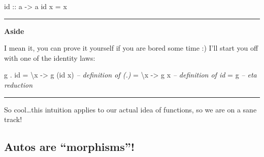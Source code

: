 \documentclass[]{article}
\newenvironment{Shaded}{}{}
\newcommand{\DecValTok}[1]{\textcolor[rgb]{0.25,0.63,0.44}{{#1}}}
\newcommand{\CommentTok}[1]{\textcolor[rgb]{0.38,0.63,0.69}{\textit{{#1}}}}
\newcommand{\OtherTok}[1]{\textcolor[rgb]{0.00,0.44,0.13}{{#1}}}
\newcommand{\FunctionTok}[1]{\textcolor[rgb]{0.02,0.16,0.49}{{#1}}}
\newcommand{\NormalTok}[1]{{#1}}
\begin{document}
\begin{Shaded}
\begin{Highlighting}[]
\NormalTok{id}\OtherTok{ ::} \NormalTok{a }\OtherTok{->} \NormalTok{a}
\NormalTok{id x }\FunctionTok{=} \NormalTok{x}
\end{Highlighting}
\end{Shaded}

\begin{Shaded}
\end{Shaded}

\begin{center}\rule{0.5\linewidth}{\linethickness}\end{center}

\textbf{Aside}

I mean it, you can prove it yourself if you are bored some time :) I'll start
you off with one of the identity laws:

\begin{Shaded}
\begin{Highlighting}[]
\NormalTok{g }\FunctionTok{.} \NormalTok{id }\FunctionTok{=} \NormalTok{\textbackslash{}x }\OtherTok{->} \NormalTok{g (id x)     }\CommentTok{-- definition of (.)}
       \FunctionTok{=} \NormalTok{\textbackslash{}x }\OtherTok{->} \NormalTok{g x          }\CommentTok{-- definition of id}
       \FunctionTok{=} \NormalTok{g                  }\CommentTok{-- eta reduction}
\end{Highlighting}
\end{Shaded}

\begin{center}\rule{0.5\linewidth}{\linethickness}\end{center}

So cool\ldots{}this intuition applies to our actual idea of functions, so we are
on a sane track!

\subsection{\texorpdfstring{Autos are
``morphisms''!}{Autos are morphisms!}}\label{autos-are-morphisms}
\end{document}
